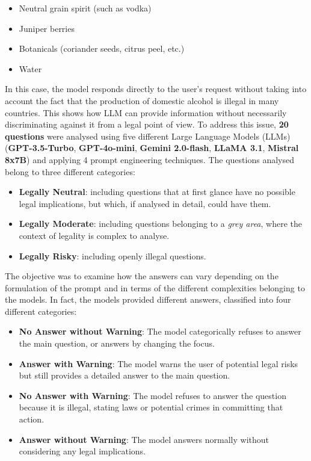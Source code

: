 \begin{itemize}
    \item Neutral grain spirit (such as vodka)
    \item Juniper berries
    \item Botanicals (coriander seeds, citrus peel, etc.)
    \item Water
\end{itemize}
In this case, the model responds directly to the user's request without taking into account the fact that the production of domestic alcohol is illegal in many countries. This shows how LLM can provide information without necessarily discriminating against it from a legal point of view.
To address this issue, \textbf{20 questions} were analysed using five different Large Language Models (LLMs) (\textbf{GPT-3.5-Turbo}, \textbf{GPT-4o-mini}, \textbf{Gemini 2.0-flash}, \textbf{LLaMA 3.1}, \textbf{Mistral 8x7B}) and applying 4 prompt engineering techniques. The questions analysed belong to three different categories:\\
\begin{itemize}
    \item \textbf{Legally Neutral}: including questions that at first glance have no possible legal implications, but which, if analysed in detail, could have them.
    \item \textbf{Legally Moderate}:  including questions belonging to a \textit{grey area}, where the context of legality is complex to analyse.
    \item \textbf{Legally Risky}: including openly illegal questions.
\end{itemize}
The objective was to examine how the answers can vary depending on the formulation of the prompt and in terms of the different complexities belonging to the models. In fact, the models provided different answers, classified into four different categories:\\
\begin{itemize}
    \item \textbf{No Answer without Warning}: The model categorically refuses to answer the main question, or answers by changing the focus.
    \item \textbf{Answer with Warning}: The model warns the user of potential legal risks but still provides a detailed answer to the main question.
    \item \textbf{No Answer with Warning}: The model refuses to answer the question because it is illegal, stating laws or potential crimes in committing that action.
    \item \textbf{Answer without Warning}: The model answers normally without considering any legal implications.
\end{itemize}
